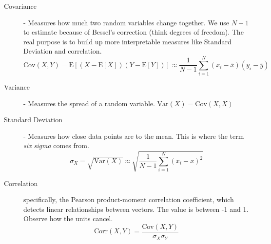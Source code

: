 \documentclass{article}
\newcommand{\E}{\mathrm{E}}
\newcommand{\Var}{\mathrm{Var}}
\newcommand{\Cov}{\mathrm{Cov}}
\newcommand{\Corr}{\mathrm{Corr}}
\begin{document}
\begin{description}

\item[Covariance] - Measures how much two random variables change together. We use $N - 1$ to estimate because of Bessel's correction (think degrees of freedom). The real purpose is to build up more interpretable measures like Standard Deviation and correlation.
\[
    \Cov(X,Y) = \E[(X - \E[X])(Y - \E[Y])] \approx
    \frac{1}{N - 1} \sum_{i=1}^N (x_i - \bar{x})(y_i - \bar{y})
\]

\item[Variance] - Measures the spread of a random variable. $\Var(X) = \Cov(X,X)$

\item[Standard Deviation] - Measures how close data points are to the mean. This is where the term \emph{six sigma} comes from.
\[
    \sigma_X = \sqrt{\Var(X)} \approx 
    \sqrt{\frac{1}{N-1} \sum_{i=1}^N(x_i - \bar{x})^2}
\]

\item[Correlation] specifically, the Pearson product-moment correlation coefficient, which detects linear relationships between vectors. The value is between -1 and 1. Observe how the units cancel.
\[
    \Corr(X,Y) = \frac{\Cov(X,Y)}{\sigma_X \sigma_Y}
\]

\end{description}
\end{document}
